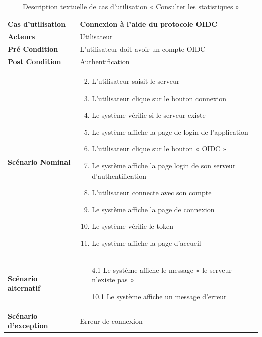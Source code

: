 \begin{longtable}{|p{5cm}|p{10cm}|}
  \caption{Description textuelle de cas d'utilisation « Consulter les statistiques »} \label{tab:use_case_oidc_connect} \\
\hline
\textbf{Cas d'utilisation}&Connexion à l'aide du protocole OIDC\\
\hline
\textbf{Acteurs}&Utilisateur\\
\hline
\textbf{Pré Condition}&L'utilisateur doit avoir un compte OIDC\\
\hline
\textbf{Post Condition}&Authentification\\
\hline
\textbf{Scénario Nominal}&
\vspace{-\baselineskip}
\begin{enumerate}
  \setcounter{enumi}{1}
    \item L'utilisateur saisit le serveur
    \item L'utilisateur clique sur le bouton connexion
    \item Le système vérifie si le serveur existe
    \item Le système affiche la page de login de l'application
    \item L'utilisateur clique sur le bouton « OIDC »
    \item Le système affiche la page login de son serveur d'authentification
    \item L'utilisateur connecte avec son compte
    \item Le système affiche la page de connexion 
    \item Le système vérifie le token
    \item Le système affiche la page d'accueil 
  
\end{enumerate}\\
\hline
\textbf{Scénario alternatif}&
\vspace{-\baselineskip}
\begin{enumerate}
  \item [4.1] Le système affiche le message « le serveur n'existe pas »
  \item [10.1] Le système affiche un message d'erreur
\end{enumerate}\\
\hline
\textbf{Scénario d'exception}&Erreur de connexion\\
\hline

\end{longtable}


